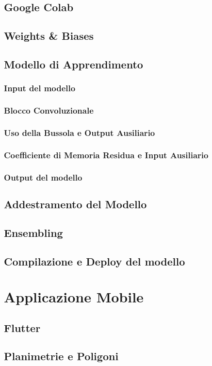 \documentclass[12pt]{report}
\begin{document}
\section{Google Colab}
\section{Weights \& Biases}
\section{Modello di Apprendimento}
\subsection{Input del modello}
\subsection{Blocco Convoluzionale}
\subsection{Uso della Bussola e Output Ausiliario}
\subsection{Coefficiente di Memoria Residua e Input Ausiliario}
\subsection{Output del modello}
\section{Addestramento del Modello}
\section{Ensembling}
\section{Compilazione e Deploy del modello}

\chapter{Applicazione Mobile}
\section{Flutter}
\section{Planimetrie e Poligoni}
\end{document}
